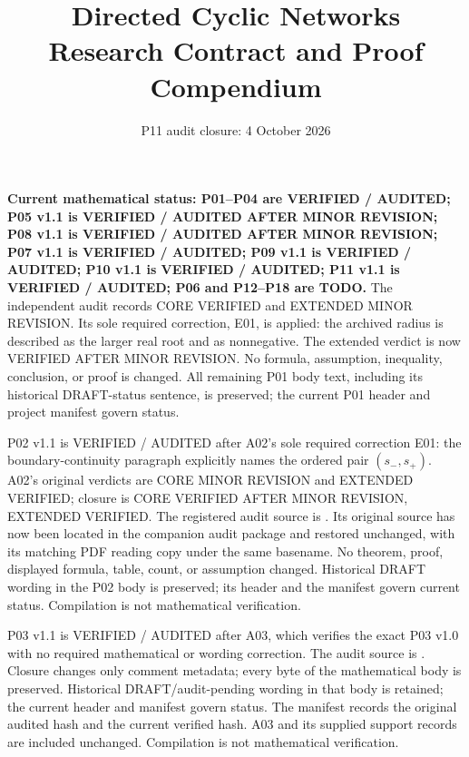 \documentclass[11pt]{article}
\title{Directed Cyclic Networks\\Research Contract and Proof Compendium}
\author{}
\date{P11 audit closure: 4 October 2026}
\begin{document}
\maketitle
\begingroup\small
\noindent\textbf{Current mathematical status: P01--P04 are VERIFIED / AUDITED;
P05 v1.1 is VERIFIED / AUDITED AFTER MINOR REVISION; P08 v1.1 is VERIFIED / AUDITED AFTER MINOR REVISION;
P07 v1.1 is VERIFIED / AUDITED; P09 v1.1 is VERIFIED / AUDITED; P10 v1.1 is VERIFIED / AUDITED; P11 v1.1 is VERIFIED / AUDITED; P06 and P12--P18 are TODO.} The independent audit
 records CORE VERIFIED
and EXTENDED MINOR REVISION. Its sole required correction, E01, is applied:
the archived radius is described as the larger real root and as nonnegative.
The extended verdict is now VERIFIED AFTER MINOR REVISION. No formula,
assumption, inequality, conclusion, or proof is changed. All remaining P01
body text, including its historical DRAFT-status sentence, is preserved;
the current P01 header and project manifest govern status.

\smallskip\noindent P02 v1.1 is VERIFIED / AUDITED after A02's sole required
correction E01: the boundary-continuity paragraph explicitly names the
ordered pair $(s_-,s_+)$. A02's original verdicts are CORE MINOR REVISION
and EXTENDED VERIFIED; closure is CORE VERIFIED AFTER MINOR REVISION,
EXTENDED VERIFIED. The registered audit source is
. Its original
source has now been located in the companion audit package and restored
unchanged, with its matching PDF reading copy under the same basename.
No theorem, proof, displayed formula, table, count, or assumption changed.
Historical DRAFT wording in the P02 body is preserved; its header and the
manifest govern current status. Compilation is not mathematical verification.

\smallskip\noindent P03 v1.1 is VERIFIED / AUDITED after A03, which verifies
the exact P03 v1.0 with no required mathematical or wording correction.
The audit source is .
Closure changes only
comment metadata; every byte of the mathematical body is preserved.
Historical DRAFT/audit-pending wording in that body is retained; the current
header and manifest govern status. The manifest records the original audited
hash and the current verified hash. A03 and its supplied support records are
included unchanged. Compilation is not mathematical verification.
\end{document}
